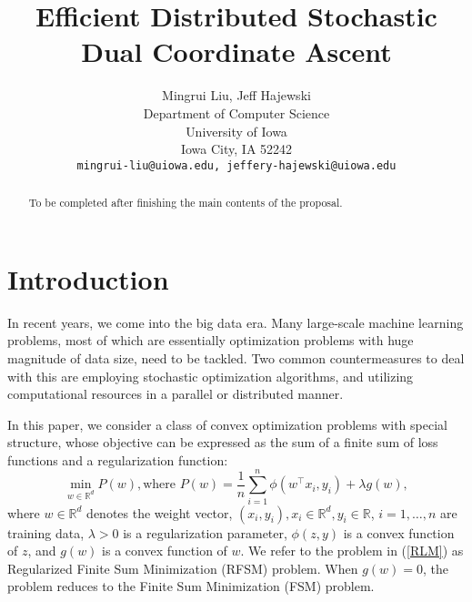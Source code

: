 \documentclass{article}
\title{Efficient Distributed Stochastic Dual Coordinate Ascent}
\author{
  Mingrui Liu, Jeff Hajewski \\
  Department of Computer Science\\
  University of Iowa\\
  Iowa City, IA  52242 \\
  \texttt{mingrui-liu@uiowa.edu, jeffery-hajewski@uiowa.edu} \\
}
\def \R {\mathbb{R}}
\def \R {\mathbb{R}}
\begin{document}

\maketitle

\begin{abstract}
To be completed after finishing the main contents of the proposal.
\end{abstract}

\section{Introduction}
In recent years, we come into the big data era. Many large-scale machine
learning problems, most of which are essentially optimization problems with huge
magnitude of data size, need to be tackled. Two common countermeasures to deal
with this are employing stochastic optimization algorithms, and utilizing
computational resources in a parallel or distributed
manner\cite{boyd2011distributed}. 

In this paper, we consider a class of convex optimization problems with special
structure, whose objective can be expressed as the sum of a finite sum of loss
functions and a regularization function: \begin{equation}
\label{RLM}
	\min_{w\in\R^d}P(w), \text{where }P(w)=\frac{1}{n}\sum_{i=1}^{n}\phi(w^\top x_i,y_i)+\lambda g(w),
\end{equation}
where $w\in\R^d$ denotes the weight vector, $(x_i,y_i),x_i\in\R^d,y_i\in\R$,
$i=1,\ldots,n$ are training data, $\lambda>0$ is a regularization parameter,
$\phi(z,y)$ is a convex function of $z$, and $g(w)$ is a convex function of $w$.
We refer to the problem in (\ref{RLM}) as Regularized Finite Sum Minimization
(RFSM) problem. When $g(w)=0$, the problem reduces to the Finite Sum
Minimization (FSM) problem.
\end{document}
